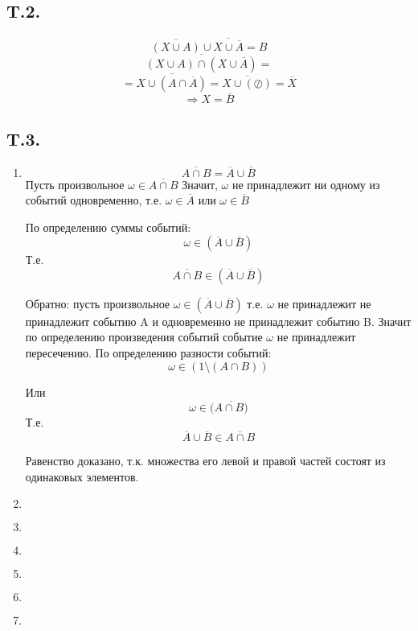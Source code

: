 \documentclass[a4paper,12pt]{article} %
\begin{document}
\newpage
\subsection{T.2.}

\[ \overline{(X \cup A)} \cup \overline{X \cup \overline{A}} = B \]
\[ \overline{(X \cup A) \cap (X \cup \overline{A})} =   \]
\[ = \overline{X \cup (A \cap \overline{A})} = 
\overline{X \cup (\oslash) } = \overline{X}  \]
\[ \Rightarrow X = \overline{B}  \]

\subsection{T.3.}

\begin{enumerate}
\item
\[ \overline{A \cap B} = \overline{A} \cup \overline{B} \]
Пусть произвольное $\omega \in \overline{A \cap B}$
Значит, $\omega$ не принадлежит ни одному из событий одновременно,
т.е.
$\omega \in \overline{A}$ или $\omega \in \overline{B}$

По определению суммы событий:
\[ \omega \in (\overline{A} \cup \overline{B})  \]
Т.е. \[  \overline{A \cap B} \in (\overline{A} \cup \overline{B}) \]

Обратно: пусть произвольное
 $\omega \in (\overline{A} \cup \overline{B})$
 т.е. $ \omega $ не принадлежит не принадлежит событию A и одновременно не принадлежит событию B. Значит по определению произведения событий событие $ \omega $ не принадлежит пересечению.
 По определению разности событий:
 \[ \omega  \in (1 \setminus (A \cap B)) \]
 
 Или
 \[ \omega  \in (\overline{A \cap B)} \]
 Т.е. 
\[\overline{A} \cup \overline{B} \in  \overline{A \cap B} \]

Равенство доказано, т.к. множества его левой и правой частей состоят из одинаковых элементов.
\item 
\[  \]
\item
\[  \]
\item
\[  \]
\item
\[  \]
\item
\[  \]
\item
\[  \]
\end{enumerate}

\newpage
\end{document}
